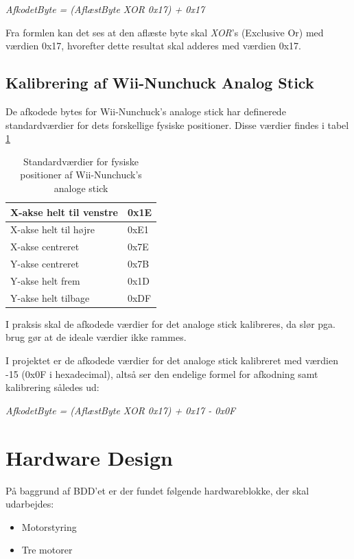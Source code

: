 \textit{AfkodetByte = (AflæstByte XOR 0x17) + 0x17}

Fra formlen kan det ses at den aflæste byte skal \textit{XOR}'s (Exclusive Or) med værdien 0x17, hvorefter dette resultat skal adderes med værdien 0x17.

\subsection{Kalibrering af Wii-Nunchuck Analog Stick}
De afkodede bytes for Wii-Nunchuck's analoge stick har definerede standardværdier for dets forskellige fysiske positioner. Disse værdier findes i tabel \ref{tabel:WiiNunchuckStickPositioner}

\begin{table}[H]
	\centering
	\begin{tabular}{|l|l|}
		\hline
		X-akse helt til venstre & 0x1E \\ \hline
		X-akse helt til højre   & 0xE1 \\ \hline
		X-akse centreret        & 0x7E \\ \hline
		Y-akse centreret        & 0x7B \\ \hline
		Y-akse helt frem        & 0x1D \\ \hline
		Y-akse helt tilbage     & 0xDF \\ \hline
	\end{tabular}
	\caption{Standardværdier for fysiske positioner af Wii-Nunchuck's analoge stick}
	\label{tabel:WiiNunchuckStickPositioner}
\end{table}

I praksis skal de afkodede værdier for det analoge stick kalibreres, da slør pga. brug gør at de ideale værdier ikke rammes. 

I projektet er de afkodede værdier for det analoge stick kalibreret med værdien -15 (0x0F i hexadecimal), altså ser den endelige formel for afkodning samt kalibrering således ud:

\textit{AfkodetByte = (AflæstByte XOR 0x17) + 0x17 - 0x0F}

\section{Hardware Design}
På baggrund af BDD'et er der fundet følgende hardwareblokke, der skal udarbejdes: 
\begin{itemize}
	\item Motorstyring
	\item Tre motorer
\end{itemize}

